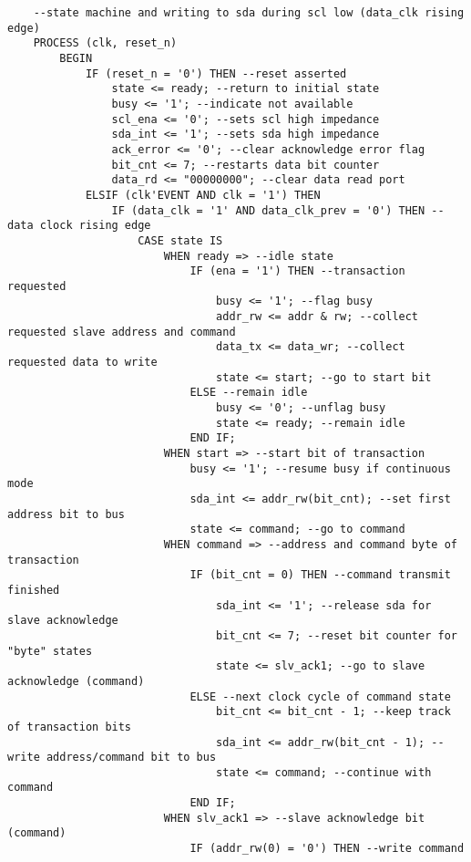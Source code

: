 \begin{lstlisting}
    --state machine and writing to sda during scl low (data_clk rising edge)
    PROCESS (clk, reset_n)
        BEGIN
            IF (reset_n = '0') THEN --reset asserted
                state <= ready; --return to initial state
                busy <= '1'; --indicate not available
                scl_ena <= '0'; --sets scl high impedance
                sda_int <= '1'; --sets sda high impedance
                ack_error <= '0'; --clear acknowledge error flag
                bit_cnt <= 7; --restarts data bit counter
                data_rd <= "00000000"; --clear data read port
            ELSIF (clk'EVENT AND clk = '1') THEN
                IF (data_clk = '1' AND data_clk_prev = '0') THEN --data clock rising edge
                    CASE state IS
                        WHEN ready => --idle state
                            IF (ena = '1') THEN --transaction requested
                                busy <= '1'; --flag busy
                                addr_rw <= addr & rw; --collect requested slave address and command
                                data_tx <= data_wr; --collect requested data to write
                                state <= start; --go to start bit
                            ELSE --remain idle
                                busy <= '0'; --unflag busy
                                state <= ready; --remain idle
                            END IF;
                        WHEN start => --start bit of transaction
                            busy <= '1'; --resume busy if continuous mode
                            sda_int <= addr_rw(bit_cnt); --set first address bit to bus
                            state <= command; --go to command
                        WHEN command => --address and command byte of transaction
                            IF (bit_cnt = 0) THEN --command transmit finished
                                sda_int <= '1'; --release sda for slave acknowledge
                                bit_cnt <= 7; --reset bit counter for "byte" states
                                state <= slv_ack1; --go to slave acknowledge (command)
                            ELSE --next clock cycle of command state
                                bit_cnt <= bit_cnt - 1; --keep track of transaction bits
                                sda_int <= addr_rw(bit_cnt - 1); --write address/command bit to bus
                                state <= command; --continue with command
                            END IF;
                        WHEN slv_ack1 => --slave acknowledge bit (command)
                            IF (addr_rw(0) = '0') THEN --write command

\end{lstlisting}
